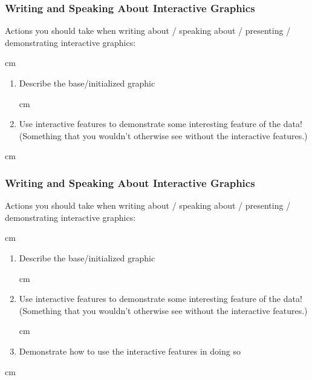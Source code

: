 \documentclass{beamer} %
\begin{document}
\begin{frame}\frametitle{Writing and Speaking About Interactive Graphics}
	\small
	
	Actions you should take when writing about / speaking about / presenting / demonstrating interactive graphics:
	
	 cm
	
	\begin{enumerate}
		\item Describe the base/initialized graphic

	 cm
	
		\item Use interactive features to demonstrate some interesting feature of the data!  (Something that you wouldn't otherwise see without the interactive features.)
	\end{enumerate}
	
	
	 cm
	
\end{frame}



\begin{frame}\frametitle{Writing and Speaking About Interactive Graphics}
	\small
	
	Actions you should take when writing about / speaking about / presenting / demonstrating interactive graphics:
	
	 cm
	
	\begin{enumerate}
		\item Describe the base/initialized graphic

	 cm
	
		\item Use interactive features to demonstrate some interesting feature of the data!  (Something that you wouldn't otherwise see without the interactive features.)
		
	 cm
	
		\item Demonstrate how to use the interactive features in doing so
	\end{enumerate}
	
	
	 cm
	
\end{frame}
\end{document}
